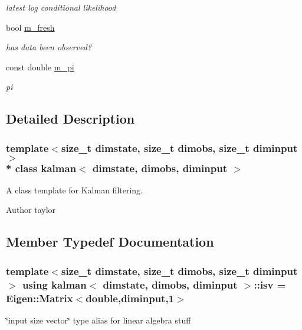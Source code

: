 \begin{DoxyCompactItemize}
\begin{DoxyCompactList}\small\item\em latest log conditional likelihood \end{DoxyCompactList}\item 
bool \hyperlink{classkalman_a6fda9bc3f49c27cd6525cb9eb37918cf}{m\+\_\+fresh}\hypertarget{classkalman_a6fda9bc3f49c27cd6525cb9eb37918cf}{}\label{classkalman_a6fda9bc3f49c27cd6525cb9eb37918cf}

\begin{DoxyCompactList}\small\item\em has data been observed? \end{DoxyCompactList}\item 
const double \hyperlink{classkalman_af6b90cbcc1d02cef1c1b436e989c5e25}{m\+\_\+pi}\hypertarget{classkalman_af6b90cbcc1d02cef1c1b436e989c5e25}{}\label{classkalman_af6b90cbcc1d02cef1c1b436e989c5e25}

\begin{DoxyCompactList}\small\item\em pi \end{DoxyCompactList}\end{DoxyCompactItemize}


\subsection{Detailed Description}
\subsubsection*{template$<$size\+\_\+t dimstate, size\+\_\+t dimobs, size\+\_\+t diminput$>$\\*
class kalman$<$ dimstate, dimobs, diminput $>$}

A class template for Kalman filtering. 

\begin{DoxyAuthor}{Author}
taylor 
\end{DoxyAuthor}


\subsection{Member Typedef Documentation}
\subsubsection[{\texorpdfstring{isv}{isv}}]{\setlength{\rightskip}{0pt plus 5cm}template$<$size\+\_\+t dimstate, size\+\_\+t dimobs, size\+\_\+t diminput$>$ using {\bf kalman}$<$ dimstate, dimobs, diminput $>$\+::{\bf isv} =  Eigen\+::\+Matrix$<$double,diminput,1$>$\hspace{0.3cm}{\ttfamily [private]}}\hypertarget{classkalman_ab085cc62231ff087133f8b24e052a36e}{}\label{classkalman_ab085cc62231ff087133f8b24e052a36e}
\char`\"{}input size vector\char`\"{} type alias for linear algebra stuff 
